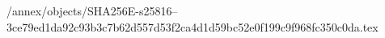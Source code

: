/annex/objects/SHA256E-s25816--3ce79ed1da92c93b3c7b62d557d53f2ca4d1d59bc52e0f199c9f968fc350c0da.tex
